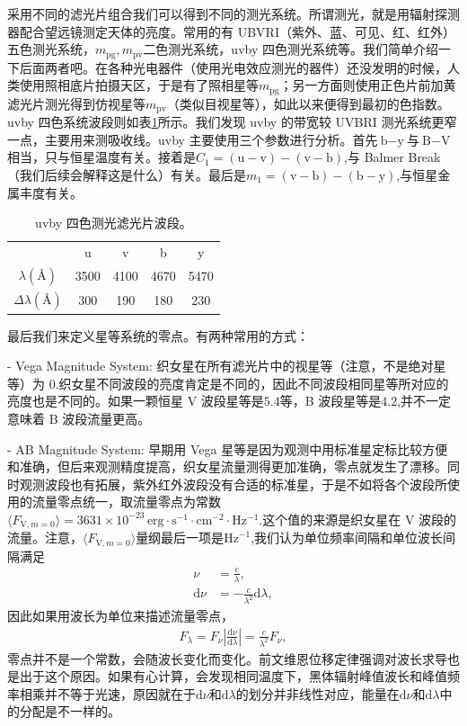 \documentclass[../天体物理基础.tex]{subfiles}
\begin{document}
采用不同的滤光片组合我们可以得到不同的测光系统。所谓测光，就是用辐射探测器配合望远镜测定天体的亮度。常用的有 UBVRI（紫外、蓝、可见、红、红外）五色测光系统，$m_{\text{pg}},m_{\text{pv}}$二色测光系统，uvby 四色测光系统等。我们简单介绍一下后面两者吧。在各种光电器件（使用光电效应测光的器件）还没发明的时候，人类使用照相底片拍摄天区，于是有了照相星等$m_{\text{pg}}$；另一方面则使用正色片前加黄滤光片测光得到仿视星等$m_{\text{pv}}$（类似目视星等），如此以来便得到最初的色指数。uvby 四色系统波段则如表\ref{uvby 四色测光滤光片波段。}所示。我们发现 uvby 的带宽较 UVBRI 测光系统更窄一点，主要用来测吸收线。uvby 主要使用三个参数进行分析。首先$\text{b}-\text{y}$与$\text{B}-\text{V}$相当，只与恒星温度有关。接着是$C_{1}=\left(\text{u}-\text{v}\right)-\left(\text{v}-\text{b}\right)$,与 Balmer Break（我们后续会解释这是什么）有关。最后是$m_{1}=\left(\text{v}-\text{b}\right)-\left(\text{b}-\text{y}\right)$,与恒星金属丰度有关。

\begin{table}[htbp]
\centering
\caption{uvby 四色测光滤光片波段。}
\begin{tabular}{c c c c c}
\hline
 & u & v & b & y\\
\cline{1-5}
$\lambda\left(\si{\angstrom}\right)$ & 3500 & 4100 & 4670 & 5470\\
\cline{1-5}
$\Delta{}\lambda\left(\si{\angstrom}\right)$ & 300 & 190 & 180 & 230\\
\cline{1-5}
\end{tabular}
\label{uvby 四色测光滤光片波段。}
\end{table}

最后我们来定义星等系统的零点。有两种常用的方式：

- Vega Magnitude System: 织女星在所有滤光片中的视星等（注意，不是绝对星等）为 0.织女星不同波段的亮度肯定是不同的，因此不同波段相同星等所对应的亮度也是不同的。如果一颗恒星 V 波段星等是$5.4$等，B 波段星等是$4.2$,并不一定意味着 B 波段流量更高。

- AB Magnitude System: 早期用 Vega 星等是因为观测中用标准星定标比较方便和准确，但后来观测精度提高，织女星流量测得更加准确，零点就发生了漂移。同时观测波段也有拓展，紫外红外波段没有合适的标准星，于是不如将各个波段所使用的流量零点统一，取流量零点为常数$\langle F_{\text{V},m=0}\rangle=3631\times10^{-23}\,\mathrm{erg\cdot s^{-1}\cdot cm^{-2}\cdot Hz^{-1}}$.这个值的来源是织女星在 V 波段的流量。注意，$\langle{}F_{\text{V},m=0}\rangle$量纲最后一项是$\mathrm{Hz}^{-1}$,我们认为单位频率间隔和单位波长间隔满足
\begin{align}
\nu&=\frac{c}{\lambda},\\
\mathrm{d}\nu&=-\frac{c}{\lambda^{2}}\mathrm{d}\lambda,
\end{align}
因此如果用波长为单位来描述流量零点，
\begin{align}
F_{\lambda}=F_{\nu}\left\vert{}\frac{\mathrm{d}\nu}{\mathrm{d}\lambda}\right\vert{}=\frac{c}{\lambda^{2}}F_{\nu},
\end{align}
零点并不是一个常数，会随波长变化而变化。前文维恩位移定律强调对波长求导也是出于这个原因。如果有心计算，会发现相同温度下，黑体辐射峰值波长和峰值频率相乘并不等于光速，原因就在于$\mathrm{d}\nu$和$\mathrm{d}\lambda$的划分并非线性对应，能量在$\mathrm{d}\nu$和$\mathrm{d}\lambda$中的分配是不一样的。
\end{document}
